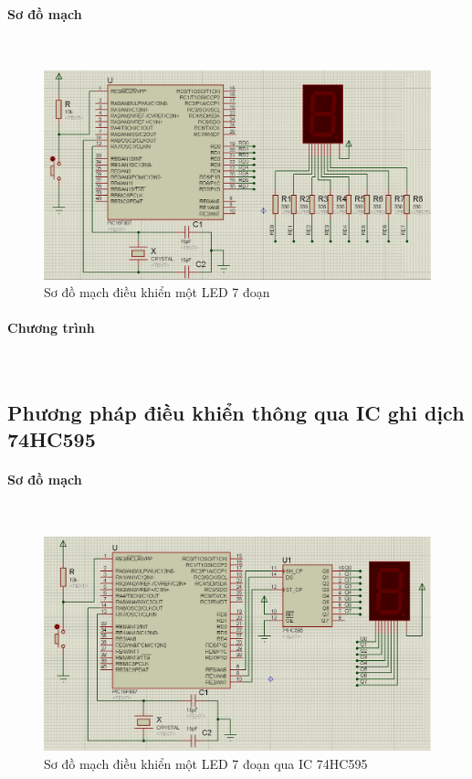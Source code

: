\paragraph{Sơ đồ mạch}{~\\}
\begin{figure}[!h]
\begin{center}
\includegraphics[scale=.5]{phu-luc/image/bai-2-phu-luc-led-7-seg}
\end{center}
\caption{Sơ đồ mạch điều khiển một LED 7 đoạn}
\end{figure}
\paragraph{Chương trình}{~\\}

\newpage
\tocless \subsection{Phương pháp điều khiển thông qua IC ghi dịch 74HC595}
\paragraph{Sơ đồ mạch}{~\\}
\begin{figure}[!h]
\begin{center}
\includegraphics[scale=.5]{phu-luc/image/bai-2-phu-luc-led-7-seg-74hc595}
\end{center}
\caption{Sơ đồ mạch điều khiển một LED 7 đoạn qua IC 74HC595}
\end{figure}
